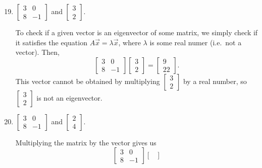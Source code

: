 \documentclass{article}
\begin{document}
\begin{enumerate}
    \setcounter{enumi}{18}
    \item \(\begin{bmatrix}
        3&0 \\ 8&-1 
    \end{bmatrix}\) and \(\begin{bmatrix}
        3 \\2 
    \end{bmatrix}\).\begin{solution}
        To check if a given vector is an eigenvector of some matrix, we simply check if it satisfies the equation \(A\vec{x} = \lambda\vec{x}\), where \(\lambda\) is 
        some real numer (i.e.\ not a vector). Then,\[
            \begin{bmatrix}
                3&0 \\ 8&-1 
            \end{bmatrix} \begin{bmatrix}
                3 \\2 
            \end{bmatrix} = \begin{bmatrix}
                9 \\ 22
            \end{bmatrix}.   
        \] This vector cannot be obtained by multiplying \(\begin{bmatrix}
            3\\2
        \end{bmatrix}\) by a real number, so \(\begin{bmatrix}
            3\\2
        \end{bmatrix}\) is not an eigenvector. 
    \end{solution}
    \item \(\begin{bmatrix}
        3&0 \\ 8&-1 
    \end{bmatrix}\) and \(\begin{bmatrix}
        2\\4
    \end{bmatrix}\).\begin{solution}
        Multiplying the matrix by the vector gives us\[
            \begin{bmatrix}
                3&0 \\ 8&-1 
            \end{bmatrix} \begin{bmatrix}

\end{bmatrix}\]
\end{solution}
\end{enumerate}
\end{document}

